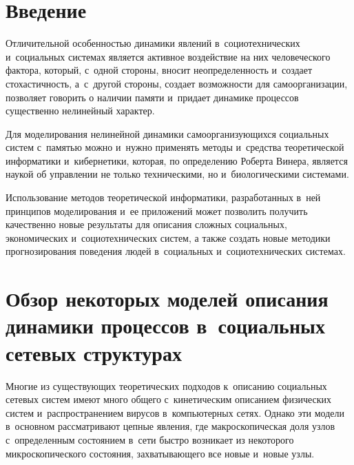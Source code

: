 

\vspace*{-4pt}


\thispagestyle{headings}

\begin{multicols}{2}

\label{st\stat}

\section{Введение}

  Отличительной особенностью динамики явлений в~социотехнических 
и~социальных системах является активное воздействие на них человеческого 
фактора, который, с~одной стороны, вносит неопределенность и~создает 
стохастичность, а~с~другой стороны, создает возможности для 
самоорганизации, позволяет говорить о наличии памяти и~придает динамике 
процессов существенно нелинейный характер.
  
  Для моделирования нелинейной динамики самоорганизующихся социальных 
систем с~памятью можно и~нужно применять методы и~средства теоретической 
информатики и~кибернетики, которая, по определению Роберта Винера, 
является наукой об управлении не только техническими, но и~биологическими 
системами.
  
  Использование методов теоретической информатики, разработанных в~ней 
принципов моделирования и~ее приложений может позволить получить 
качественно новые результаты для описания сложных социальных, 
экономических и~социотехнических систем, а также создать новые методики 
прогнозирования поведения людей в~социальных и~социотехнических системах.

  
\section{Обзор некоторых моделей описания динамики процессов 
в~социальных сетевых структурах}


  Многие из существующих теоретических подходов к~описанию социальных 
сетевых систем имеют много общего с~кинетическим описанием физических 
систем и~распространением вирусов в~компьютерных сетях. Однако эти модели 
в~основном рассматривают цепные явления, 
где макроскопическая доля узлов с~определенным состоянием в~сети быстро возникает из некоторого 
микроскопического состояния, захватывающего все новые и~новые узлы.
  

\end{multicols}

